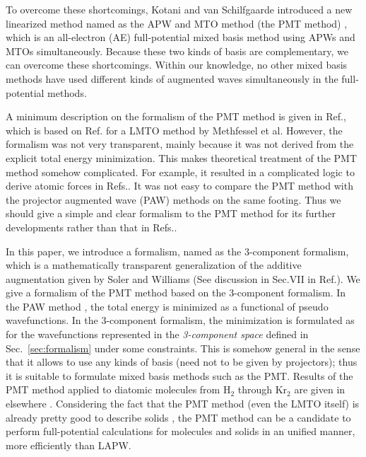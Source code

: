 \documentclass[a4paper,10pt,aip,onecolumn,amsmath,amssymb,floatfix,rmp]{revtex4-1}
\newcommand{\refsec}[1]{\mbox{Sec.~\!\ref{#1}}}
\begin{document}
To overcome these shortcomings, 
Kotani and van Schilfgaarde introduced a new linearized method 
named as the APW and MTO method (the PMT method) \cite{pmt1}, which is an all-electron (AE) 
full-potential mixed basis method using APWs and MTOs simultaneously.
Because these two kinds of basis are complementary, 
we can overcome these shortcomings. Within our knowledge, 
no other mixed basis methods have used different kinds 
of augmented waves simultaneously in the full-potential methods.

A minimum description on the formalism of the PMT method is given in Ref.\cite{pmt1}, 
which is based on Ref. for a LMTO method  
by Methfessel et al. However, the formalism was not very transparent, 
mainly because it was not derived from the explicit total energy minimization.
This makes theoretical treatment of the PMT method somehow complicated.
For example, it resulted in a complicated logic to derive atomic forces 
in Refs.. 
It was not easy to compare the PMT method with the projector augmented
wave (PAW) methods \cite{PAW,kresse99} on the same footing.
Thus we should give a simple and clear formalism to the PMT method 
for its further developments rather than that in Refs..

In this paper, we introduce a formalism, named as the 3-component
formalism, which is a mathematically transparent generalization of the additive
augmentation given by Soler and Williams \cite{soler89,soler90,soler93} 
(See discussion in Sec.VII in Ref.\cite{PAW}).
We give a formalism of the PMT method based on the 3-component formalism.
In the PAW method \cite{PAW}, the total energy is minimized as a
functional of pseudo wavefunctions. In the 3-component formalism,
the minimization is formulated as for the wavefunctions represented in the 
{\it 3-component space} defined in \refsec{sec:formalism} under some constraints.
This is somehow general in the sense that it allows to use any kinds of basis 
(need not to be given by projectors); thus it is
suitable to formulate mixed basis methods such as the PMT.
Results of the PMT method applied to diatomic molecules from H$_2$ through Kr$_2$ 
are given in elsewhere \cite{kotanimol2011}. Considering the fact
that the PMT method (even the LMTO itself) is already pretty good to
describe solids \cite{pmt1,lmfchap,kotani07a,mark06adeq},
the PMT method can be a candidate to perform full-potential
calculations for molecules and solids in an unified manner, 
more efficiently than LAPW.
\end{document}
